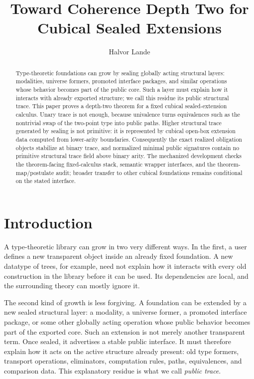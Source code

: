 \documentclass{lmcs}
\title[Toward Coherence Depth Two]{Toward Coherence Depth Two for Cubical Sealed Extensions}
\author[H.\ Lande]{Halvor Lande}
\begin{document}
\begin{abstract}
Type-theoretic foundations can grow by sealing globally acting structural
layers: modalities, universe formers, promoted interface packages, and similar
operations whose behavior becomes part of the public core.  Such a layer must
explain how it interacts with already exported structure; we call this residue
its public structural trace.  This paper proves a depth-two theorem for a fixed
cubical sealed-extension calculus.  Unary trace is not enough, because
univalence turns equivalences such as the nontrivial swap of the two-point type
into public paths.  Higher structural trace generated by sealing is not
primitive: it is represented by cubical open-box extension data computed from
lower-arity boundaries.  Consequently the exact realized obligation objects
stabilize at binary trace, and normalized minimal public signatures contain no
primitive structural trace field above binary arity.  The mechanized
development checks the theorem-facing fixed-calculus stack, semantic wrapper
interfaces, and the theorem-map/postulate audit; broader transfer to other
cubical foundations remains conditional on the stated interface.
\end{abstract}
\maketitle

\section{Introduction}

A type-theoretic library can grow in two very different ways.  In the first,
a user defines a new transparent object inside an already fixed foundation.  A
new datatype of trees, for example, need not explain how it interacts with every
old construction in the library before it can be used.  Its dependencies are
local, and the surrounding theory can mostly ignore it.

The second kind of growth is less forgiving.  A foundation can be extended by a
new sealed structural layer: a modality, a universe former, a promoted interface
package, or some other globally acting operation whose public behavior becomes
part of the exported core.  Such an extension is not merely another transparent
term.  Once sealed, it advertises a stable public interface.  It must therefore
explain how it acts on the active structure already present: old type formers,
transport operations, eliminators, computation rules, paths, equivalences, and
comparison data.  This explanatory residue is what we call \emph{public trace}.
\end{document}
